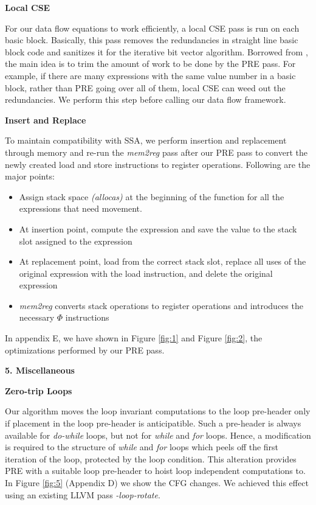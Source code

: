 \documentclass[10pt,twoside]{report}
\begin{document}
\begin{flushleft}
\textbf{\large{Local CSE}}
\end{flushleft}
For our data flow equations to work efficiently, a local CSE pass is run
on each basic block. Basically, this pass removes the redundancies in
straight line basic block code and sanitizes it for the iterative bit vector
algorithm. Borrowed from \cite{Knoop2}, the main idea
is to trim the amount of work to be done by the PRE pass. For example, if there are many
expressions with the same value number in a basic block, rather than PRE going over all of them, 
local CSE can weed out the redundancies. We perform this step before calling
our data flow framework. 

\begin{flushleft}
\textbf{\large{Insert and Replace}}
\end{flushleft}
To maintain compatibility with SSA, we perform insertion and replacement
  through memory and re-run the \emph{mem2reg} pass after our PRE pass to convert the
  newly created load and store instructions to register operations. Following
  are the major points:
\begin{itemize}  
  \item Assign stack space \emph{(allocas)} at the beginning of the
  function for all the expressions that need movement.
  \item At insertion point,
           compute the expression and save the value to the stack slot assigned to the
             expression 
  \item At replacement point, load from the correct stack
             slot, replace all uses of the original expression with the load
             instruction, and delete the original expression
  \item \emph{mem2reg} converts stack operations to register operations and introduces the 
             necessary ${\Phi}$ instructions
\end{itemize}  

In appendix E, we have shown in Figure \ref{fig:1}
and Figure \ref{fig:2}, the optimizations performed by our PRE pass. 

\begin{flushleft}
\textbf{\Large{5. Miscellaneous}}
\end{flushleft}

\begin{flushleft}
\textbf{\large{Zero-trip Loops}}
\end{flushleft}
Our algorithm moves the loop invariant
      computations to the loop pre-header only if placement in the loop pre-header is 
      anticipatible. Such a pre-header is always available for \emph{do-while} loops, 
      but not for \emph{while} and \emph{for} loops. Hence, a modification is required
      to the structure of \emph{while} and \emph{for} loops which peels off the first
      iteration of the loop, protected by the loop condition. This alteration provides 
      PRE with a suitable loop pre-header to hoist loop independent computations to.
      In Figure \ref{fig:5}  (Appendix D) we show the CFG changes. We achieved this effect using an 
      existing LLVM pass \emph{-loop-rotate}.
\end{document}
